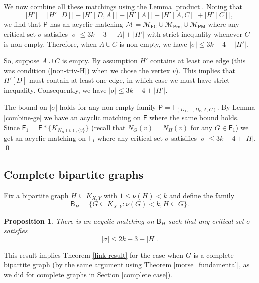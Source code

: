 \documentclass[10pt]{amsart}
\newtheorem{prop}[thm]{Proposition}
\theoremstyle{definition}
\begin{document}
	We now combine all these matchings using the Lemma \ref{product}. Noting that 
	\[|H'| = |H'[D]| + |H'[D,A]| + |H'[A]| + |H'[A,C]| + |H'[C]|,\] 
	we find that $\mathsf{P}$ has an acyclic matching $\mathcal{M} = \mathcal{M}_{\mathsf{FC}} \cup \mathcal{M}_{\mathsf{Proj}} \cup \mathcal{M}_{\mathsf{PM}}$ where any critical set $\sigma$ satisfies
	$|\sigma| \leq 3k - 3 - |A| + |H'|$ with strict inequality whenever $C$ is non-empty. Therefore, when $A\cup C$ is non-empty, we have $|\sigma| \leq 3k-4 +|H'|$.
	
	So, suppose $A\cup C$ is empty. By assumption $H'$ contains at least one edge (this was condition 
	(\ref{non-triv-H}) when we chose the vertex $v$). This implies that $H'[D]$ must contain at least one edge, in which case we must have strict inequality. Consequently, we have $|\sigma| \leq 3k-4 +|H'|$.
	
	The bound on $|\sigma|$ holds for any non-empty family $\mathsf{P} = \mathsf{F}_{(D_1, \dots, D_r; A; C)}$. By Lemma \ref{combine-ge} we have an acyclic matching on $\mathsf{F}$ where the same bound holds. Since $\mathsf{F}_1  = \mathsf{F} * \{K_{N_H(v), \{v\}}\}$ (recall that $N_G(v)=N_H(v)$ for any $G\in \mathsf{F}_1$) we get an acyclic matching on $\mathsf{F}_1$ where any critical set $\sigma$ satisifies $|\sigma|\leq 3k-4 +|H|$. \qed
	
	\subsection{Complete bipartite graphs} \label{complete bipartite}
	Fix a bipartite graph $H\subseteq K_{X,Y}$ with $1\leq \nu(H)<k$ and 
	define the family
	\[\mathsf{B}_H = \{ G\subseteq K_{X,Y} : \nu(G)< k, H\subseteq G\}. \]
	\begin{prop}\label{bipartite case}
		There is an acyclic matching on $\mathsf{B}_H$ such that any critical set $\sigma$ satisfies 
		\[|\sigma| \leq 2k-3+|H|.\]
	\end{prop}
	This result implies Theorem \ref{link-result} for the case when $G$ is a complete bipartite graph (by the same argument using Theorem \ref{morse_fundamental}, as we did for complete graphs in Section \ref{complete case}). 
	
\end{document}
